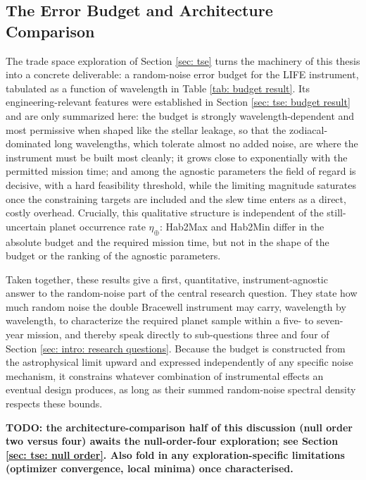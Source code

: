 \documentclass[12pt,a4paper]{article}
\numberwithin{equation}{section}
\numberwithin{figure}{section}
\numberwithin{table}{section}
\begin{document}
\subsection{The Error Budget and Architecture Comparison}
The trade space exploration of Section \ref{sec: tse} turns the machinery of this thesis into a concrete deliverable: a random-noise error budget for the LIFE instrument, tabulated as a function of wavelength in Table \ref{tab: budget result}. Its engineering-relevant features were established in Section \ref{sec: tse: budget result} and are only summarized here: the budget is strongly wavelength-dependent and most permissive when shaped like the stellar leakage, so that the zodiacal-dominated long wavelengths, which tolerate almost no added noise, are where the instrument must be built most cleanly; it grows close to exponentially with the permitted mission time; and among the agnostic parameters the field of regard is decisive, with a hard feasibility threshold, while the limiting magnitude saturates once the constraining targets are included and the slew time enters as a direct, costly overhead. Crucially, this qualitative structure is independent of the still-uncertain planet occurrence rate $\eta_\oplus$: Hab2Max and Hab2Min differ in the absolute budget and the required mission time, but not in the shape of the budget or the ranking of the agnostic parameters.

Taken together, these results give a first, quantitative, instrument-agnostic answer to the random-noise part of the central research question. They state how much random noise the double Bracewell instrument may carry, wavelength by wavelength, to characterize the required planet sample within a five- to seven-year mission, and thereby speak directly to sub-questions three and four of Section \ref{sec: intro: research questions}. Because the budget is constructed from the astrophysical limit upward and expressed independently of any specific noise mechanism, it constrains whatever combination of instrumental effects an eventual design produces, as long as their summed random-noise spectral density respects these bounds.

\textbf{TODO: the architecture-comparison half of this discussion (null order two versus four) awaits the null-order-four exploration; see Section \ref{sec: tse: null order}. Also fold in any exploration-specific limitations (optimizer convergence, local minima) once characterised.}
\end{document}
